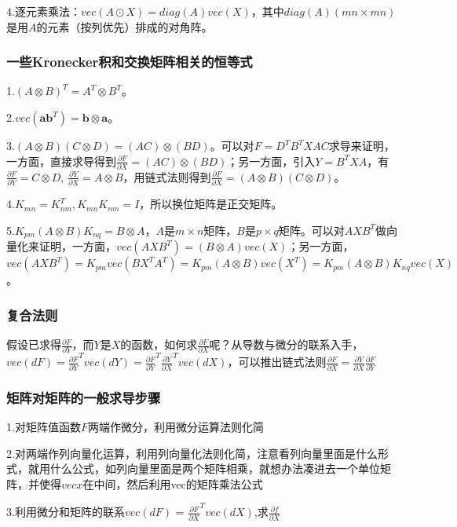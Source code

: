 \documentclass[UTF8]{ctexart}
\begin{document}
		4.逐元素乘法：${vec}(A\odot X) = {diag}(A){vec}(X)$，其中${diag}(A)(mn×mn)$是用$A$的元素（按列优先）排成的对角阵。

		\subsubsection*{一些Kronecker积和交换矩阵相关的恒等式}

		1.$(A\otimes B)^T = A^T \otimes B^T$。
		
		2.${vec}(\boldsymbol{ab}^T) = \boldsymbol{b}\otimes\boldsymbol{a}$。

		3.$(A\otimes B)(C\otimes D) = (AC)\otimes (BD)$。可以对$F = D^TB^TXAC$求导来证明，一方面，直接求导得到$\frac{\partial F}{\partial X} = (AC) \otimes (BD)$；另一方面，引入$Y = B^T X A$，有$\frac{\partial F}{\partial Y} = C \otimes D$, $\frac{\partial Y}{\partial X} = A \otimes B$，用链式法则得到$\frac{\partial F}{\partial X} = (A\otimes B)(C \otimes D)$。
		
		4.$K_{mn} = K_{nm}^T, K_{mn}K_{nm} = I$，所以换位矩阵是正交矩阵。

		5.$K_{pm}(A\otimes B) K_{nq} = B\otimes A$，$A$是$m×n$矩阵，$B$是$p×q$矩阵。可以对$AXB^T$做向量化来证明，一方面，${vec}(AXB^T) = (B\otimes A){vec}(X)$；另一方面，${vec}(AXB^T) = K_{pm}{vec}(BX^TA^T) = K_{pm}(A\otimes B){vec}(X^T) = K_{pm}(A\otimes B) K_{nq}{vec}(X)$。

		\subsubsection*{复合法则}
		假设已求得$\frac{\partial F}{\partial Y}$，而$Y$是$X$的函数，如何求$\frac{\partial F}{\partial X}$呢？从导数与微分的联系入手，${vec}(dF) = \frac{\partial F}{\partial Y}^T{vec}(dY) = \frac{\partial F}{\partial Y}^T\frac{\partial Y}{\partial X}^T{vec}(dX) $，可以推出链式法则$\frac{\partial F}{\partial X} = \frac{\partial Y}{\partial X}\frac{\partial F}{\partial Y}$

		\subsubsection*{矩阵对矩阵的一般求导步骤}
		{\color{red}
		1.对矩阵值函数$F$两端作微分，利用微分运算法则化简

		2.对两端作列向量化运算，利用列向量化法则化简，注意看列向量里面是什么形式，就用什么公式，如列向量里面是两个矩阵相乘，就想办法凑进去一个单位矩阵，并使得${vec}x$在中间，然后利用vec的矩阵乘法公式

		3.利用微分和矩阵的联系${vec}(dF)$ = $\frac{\partial F}{\partial X}^T {vec}(dX)$,求$\frac{\partial f}{\partial X}$}
\end{document}
